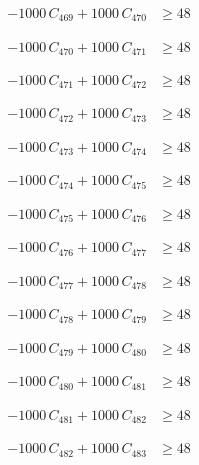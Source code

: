 \documentclass[a4paper,11pt]{article}
\begin{document}
\begin{align}
-1000\,C_{469} + 1000\,C_{470} &\geq 48 \nonumber
\end{align}

\begin{align}
-1000\,C_{470} + 1000\,C_{471} &\geq 48 \nonumber
\end{align}

\begin{align}
-1000\,C_{471} + 1000\,C_{472} &\geq 48 \nonumber
\end{align}

\begin{align}
-1000\,C_{472} + 1000\,C_{473} &\geq 48 \nonumber
\end{align}

\begin{align}
-1000\,C_{473} + 1000\,C_{474} &\geq 48 \nonumber
\end{align}

\begin{align}
-1000\,C_{474} + 1000\,C_{475} &\geq 48 \nonumber
\end{align}

\begin{align}
-1000\,C_{475} + 1000\,C_{476} &\geq 48 \nonumber
\end{align}

\begin{align}
-1000\,C_{476} + 1000\,C_{477} &\geq 48 \nonumber
\end{align}

\begin{align}
-1000\,C_{477} + 1000\,C_{478} &\geq 48 \nonumber
\end{align}

\begin{align}
-1000\,C_{478} + 1000\,C_{479} &\geq 48 \nonumber
\end{align}

\begin{align}
-1000\,C_{479} + 1000\,C_{480} &\geq 48 \nonumber
\end{align}

\begin{align}
-1000\,C_{480} + 1000\,C_{481} &\geq 48 \nonumber
\end{align}

\begin{align}
-1000\,C_{481} + 1000\,C_{482} &\geq 48 \nonumber
\end{align}

\begin{align}
-1000\,C_{482} + 1000\,C_{483} &\geq 48 \nonumber
\end{align}
\end{document}
